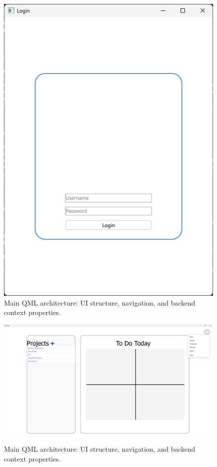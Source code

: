 \documentclass{report}
\begin{document}
\begin{figure}[h]
\centering
\includegraphics[width=\linewidth,height=0.3\textheight,keepaspectratio]{png_files/Login.png}
\caption{Main QML architecture: UI structure, navigation, and backend context properties.}
\end{figure}

\begin{figure}
\centering
\includegraphics[width=\linewidth,height=\textheight,keepaspectratio]{png_files/Dashboard.png}
\caption{Main QML architecture: UI structure, navigation, and backend context properties.}
\end{figure}
\end{document}

